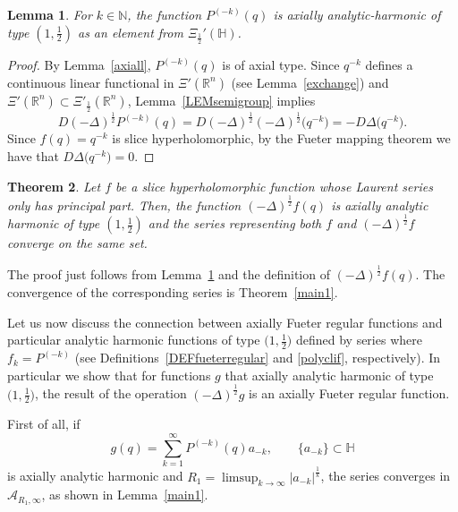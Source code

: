 \documentclass[reqno,11pt]{amsart}
\newtheorem{theorem}{Theorem}[section]
\newtheorem{lemma}[theorem]{Lemma}
\theoremstyle{definition}
\begin{document}
\begin{lemma}
	\label{LEMaxiallymonomials}
	For $k\in \mathbb{N}$, the function $P^{(-k)}(q)$ is axially analytic-harmonic of type $(1,\frac{1}{2})$ as an element from $\Xi_{\frac{1}{2}}'(\mathbb{H})$.
\end{lemma}
\begin{proof}
By Lemma~\ref{axiall}, $P^{(-k)}(q)$ is of axial type. Since $q^{-k}$ defines a continuous linear functional in $\Xi'(\mathbb{R}^n)$ (see Lemma~\ref{exchange}) and $ \Xi'(\mathbb{R}^n)\subset\Xi'_{\frac12}(\mathbb{R}^n)$,
Lemma~\ref{LEMsemigroup} implies
\[
D(-\Delta)^\frac{1}{2}P^{(-k)}(q)=D(-\Delta)^\frac{1}{2}(-\Delta)^\frac{1}{2}\big(q^{-k}\big) =- D\Delta\big(q^{-k}\big).
\]
Since $f(q)=q^{-k}$ is slice hyperholomorphic, by the Fueter mapping theorem we have that $D\Delta\big(q^{-k}\big)=0$.
\end{proof}
\begin{theorem}
	Let $f$ be a slice hyperholomorphic function whose Laurent series only has principal part. Then, the function $(-\Delta)^\frac{1}{2} f(q) $ is axially analytic harmonic of type $(1,\frac{1}{2})$ and the series representing both $f$ and $(-\Delta)^\frac{1}{2}f$ converge on the same set.
\end{theorem}
The proof just follows from Lemma~\ref{LEMaxiallymonomials} and the definition of $(-\Delta)^\frac{1}{2} f(q)$. The convergence of the corresponding series is Theorem~\ref{main1}.


\medskip

Let us now discuss the connection between axially Fueter regular functions and particular analytic harmonic functions of type $ \big(1, \frac{1}{2}\big)$ defined by series where $f_k=P^{(-k)}$  (see Definitions~\ref{DEFfueterregular} and \ref{polyclif}, respectively). In particular we show that for functions $g$ that axially analytic harmonic of type $ \big(1, \frac{1}{2}\big)$, the result of the operation $(-\Delta)^\frac{1}{2}g$ is an axially Fueter regular function.



First of all, if
\begin{equation*}
	g(q)=\sum_{k=1}^{\infty} P^{(-k)}(q) a_{-k}, \qquad \{a_{-k}\} \subset \mathbb{H}
\end{equation*}
is axially analytic harmonic and $R_1= \limsup_{k\to \infty} |a_{-k}|^\frac{1}{k}$, the series converges in $\mathcal{A}_{R_1,\infty}$, as shown in Lemma~\ref{main1}.
\end{document}
